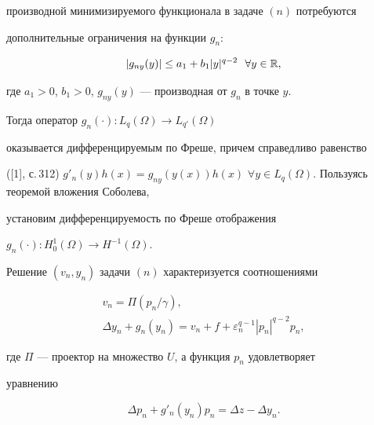 производной минимизируемого функционала в задаче $(n)$ потребуются 


дополнительные ограничения на функции $g_n$:


$$ 


|g_{ny}(y)|\le a_1+b_1|y|^{q-2}\ \ \forall y\in\Bbb R, 


$$ 


где $a_1>0$, $b_1>0$, $g_{ny}(y)$ --- производная от $g_n$ в точке $y$. 


Тогда оператор $g_n(\cdot):L_q(\Omega)\to L_{q'}(\Omega)$ 


оказывается дифференцируемым по Фреше, причем справедливо равенство 


([1], с.\,312) $g'_n(y)h(x)=g_{ny}(y(x))h(x)$\; $\forall y\in 


L_q(\Omega)$. Пользуясь теоремой вложения Соболева, 


установим дифференцируемость по Фреше отображения 


$g_n(\cdot):H^1_0(\Omega)\to H^{-1}(\Omega)$. 


 


\begin{thm} 


Решение $(v_n,y_n)$ задачи $(n)$ характеризуется соотношениями 


\begin{gather} 


v_n=\Pi(p_n/\gamma), \\ 


% 


\Delta y_n+g_n(y_n)=v_n+f+\varepsilon^{q-1}_n 


|p_n|^{q-2}p_n, 


\end{gather} 


где $\Pi$ --- проектор на множество $U$, а функция $p_n$ удовлетворяет 


уравнению 


\begin{equation} 


\Delta p_n+g'_n(y_n)p_n=\Delta z-\Delta y_n. 


\end{equation} 


\end{thm} 


 


